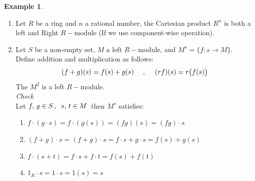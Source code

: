 \documentclass[11pt,a4paper]{article}
\theoremstyle{definition}
\newtheorem{exa}[thm]{Example}
\begin{document}
\begin{exa}
\begin{enumerate}
$$(a,x) = \begin{pmatrix}
\begin{pmatrix}
a_{11} & \cdots\cdots & a_{1n}\\
a_{21} & \cdots\cdots & a_{2n}\\
\vdots &              & \vdots\\
\vdots &              & \vdots\\
a_{n1} & \cdots\cdots & a_{nn}\\
\end{pmatrix} \hspace{0.2cm},\hspace{0.2cm}
\begin{pmatrix}
x_1\\
\vdots\\
\vdots\\
x_n\\
\end{pmatrix}
\end{pmatrix}$$\\



$$ ax = \begin{pmatrix}
a_{11} x_1 + a_{12} x_2  + \, \cdots\cdots \, + a_{1n} x_n\\
\vdots\\
\vdots\\
a_{n1} x_1 + a_{n2} x_2 + \, \cdots\cdots \, + a_{nn} x_n\\
\end{pmatrix}$$



\item Let $R$ be a ring and $n$ a rational number, the Cartesian product $R^n$ is both a left and Right $R-$module (If we use component-wise operation).

\item Let $S$ be a non-empty set, $M$ a left $R-$module, and $M^s = \{ f: s\longrightarrow M\}$. Define addition and multiplication as follows:
$$(f  + g) (s) = f(s) + g(s)\,\hspace{0.4cm} ,\hspace{0.4cm} \, (rf) (s) = r\big(f(s)\big)$$
The $M^2$ is a left $R-$module.\\

\textit{Check}\\
Let $f,\, g\in S\, ,\hspace{0.2cm} s,\, t\in M\,$ then $M^s$ satisfies:
\begin{enumerate}
    \item[(i)] $f\cdot (g\cdot s) = f\cdot (g(s)) = (fg) (s) = (fg)\cdot s$
    \item[(ii)] $(f + g)\cdot s = (f + g)\cdot s = f\cdot s + g\cdot s = f(s) + g(s)$
    \item[(iii)] $f\cdot (s + t) = f\cdot s + f\cdot t = f(s) + f(t)$
    \item[(iv)] $1_R\cdot s = 1\cdot s = 1(s) = s$\\
\end{enumerate}




\end{enumerate}
\end{exa}
\end{document}
